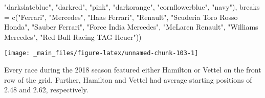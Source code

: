 \documentclass[
]{book}
\newenvironment{Shaded}{\begin{snugshade}}{\end{snugshade}}
\newcommand{\AttributeTok}[1]{\textcolor[rgb]{0.77,0.63,0.00}{#1}}
\newcommand{\FunctionTok}[1]{\textcolor[rgb]{0.00,0.00,0.00}{#1}}
\newcommand{\NormalTok}[1]{#1}
\newcommand{\StringTok}[1]{\textcolor[rgb]{0.31,0.60,0.02}{#1}}
\begin{document}
\begin{Shaded}
\begin{Highlighting}[]
                               \StringTok{"darkslateblue"}\NormalTok{, }
                                \StringTok{"darkred"}\NormalTok{,  }
                                \StringTok{"pink"}\NormalTok{, }
                                \StringTok{"darkorange"}\NormalTok{, }
                                \StringTok{"cornflowerblue"}\NormalTok{,}
                               \StringTok{"navy"}\NormalTok{),}
                     \AttributeTok{breaks =} \FunctionTok{c}\NormalTok{(}\StringTok{"Ferrari"}\NormalTok{,}
                                 \StringTok{"Mercedes"}\NormalTok{,}
                                 \StringTok{"Haas Ferrari"}\NormalTok{,}
                                 \StringTok{"Renault"}\NormalTok{,}
                                 \StringTok{"Scuderia Toro Rosso Honda"}\NormalTok{,}
                                 \StringTok{"Sauber Ferrari"}\NormalTok{, }
                                 \StringTok{"Force India Mercedes"}\NormalTok{,}
                                 \StringTok{"McLaren Renault"}\NormalTok{,}
                                 \StringTok{"Williams Mercedes"}\NormalTok{,}
                                 \StringTok{"Red Bull Racing TAG Heuer"}\NormalTok{))}
\end{Highlighting}
\end{Shaded}

\begin{center}\texttt{[image: \_main\_files/figure-latex/unnamed-chunk-103-1]} \end{center}

Every race during the 2018 season featured either Hamilton or Vettel on the front row of the grid. Further, Hamilton and Vettel had average starting positions of 2.48 and 2.62, respectively.
\end{document}
